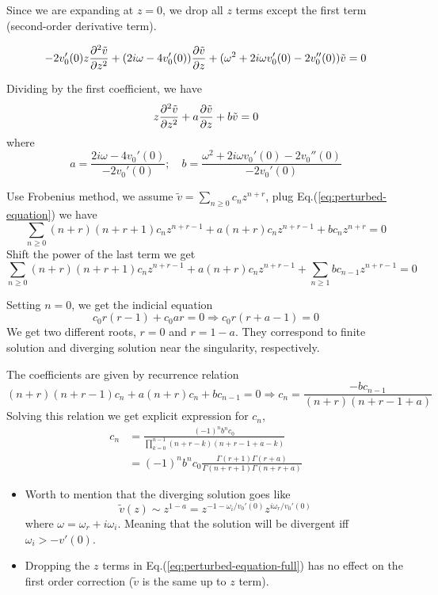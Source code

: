 Since we are expanding at $z=0$, we drop all $z$ terms except the first term (second-order derivative term).

\[ - 2v_0'(0)z\pdv[2]{\tilde{v}}{z}
    + (2i\omega - 4v_0'(0))\pdv{\tilde{v}}{z}
    + (\omega^2 + 2i\omega v_0'(0) - 2v_0''(0))\tilde{v}
    = 0 \]

Dividing by the first coefficient, we have
\begin{equation}
    z\pdv[2]{\tilde{v}}{z} + a\pdv{\tilde{v}}{z} + b\tilde{v} = 0
    \label{eq:perturbed-equation}
\end{equation}
where
\[ a = \frac{2i\omega - 4v_0'(0)}{-2v_0'(0)}; \quad
    b = \frac{\omega^2 + 2i\omega v_0'(0) - 2v_0''(0)}{-2v_0'(0)}
\]

Use Frobenius method, we assume $\tilde{v} = \sum_{n\geq 0}c_nz^{n+r}$, plug Eq.(\ref{eq:perturbed-equation}) we have
\[ \sum_{n \geq 0} (n+r)(n+r+1) c_n z^{n+r-1} + a(n+r)c_nz^{n+r-1} + bc_nz^{n+r} = 0\]
Shift the power of the last term we get
\[ \sum_{n \geq 0} (n+r)(n+r+1) c_n z^{n+r-1} + a(n+r)c_nz^{n+r-1} + \sum_{n \geq 1} bc_{n-1}z^{n+r-1} = 0\]

Setting $n=0$, we get the indicial equation
\[ c_0 r(r-1) + c_0 ar = 0 \Rightarrow c_0r(r+a-1) = 0 \]
We get two different roots, $r=0$ and $r=1-a$. They correspond to finite solution and diverging solution near the singularity, respectively.

The coefficients are given by recurrence relation
\[ (n+r)(n+r-1)c_n + a(n+r)c_n + bc_{n-1} = 0
    \Rightarrow
    c_n = \frac{-bc_{n-1}}{(n+r)(n+r-1+a)}
\]
Solving this relation we get explicit expression for $c_n$,
\begin{equation}
    \begin{aligned}
        c_n & = \frac{(-1)^n b^n c_0}{\prod_{k=0}^{n-1} (n+r-k)(n+r-1+a-k)}              \\
            & = (-1)^n b^n c_0 \frac{\Gamma(r+1)\Gamma(r+a)}{\Gamma(n+r+1)\Gamma(n+r+a)}
    \end{aligned}
    \label{eq:coefficient}
\end{equation}

\begin{itemize}
    \item Worth to mention that the diverging solution goes like
          \[ \tilde{v}(z) \sim z^{1-a} = z^{-1-\omega_i/v_0'(0)}z^{i\omega_r/v_0'(0)}  \]
          where $\omega = \omega_r + i\omega_i$. Meaning that the solution will be divergent iff $\omega_i > -v'(0)$.
    \item Dropping the $z$ terms in Eq.(\ref{eq:perturbed-equation-full}) has no effect on the first order correction ($\tilde{v}$ is the same up to $z$ term).
\end{itemize}

